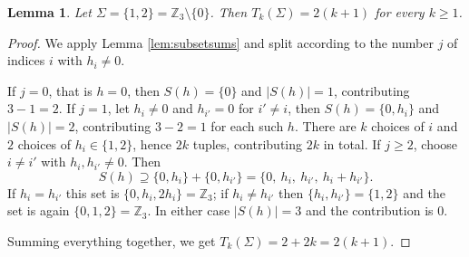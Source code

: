 \documentclass[10pt,a4paper]{amsart}
\newtheorem{lemma}{Lemma}
\newcommand{\Z}{\mathbb{Z}}
\begin{document}
\begin{lemma}\label{lem:Z3count}
Let $\Sigma=\{1,2\}=\Z_3\setminus\{0\}$. Then $T_k(\Sigma)=2(k+1)$ for every $k\ge1$.
\end{lemma}

\begin{proof}
We apply Lemma \ref{lem:subsetsums} and split according to the number $j$ of indices $i$ with $h_i\ne0$.

If $j=0$, that is $h=0$, then $S(h)=\{0\}$ and $|S(h)|=1$, contributing $3-1=2$.
If $j=1$, let $h_i\ne0$ and $h_{i'}=0$ for $i'\ne i$, then $S(h)=\{0,h_i\}$ and $|S(h)|=2$, contributing $3-2=1$ for each such $h$. There are $k$ choices of $i$ and $2$ choices of $h_i\in\{1,2\}$, hence $2k$ tuples, contributing $2k$ in total.
If $j\ge2$, choose $i\ne i'$ with $h_i,h_{i'}\ne0$. Then
\[
S(h)\supseteq\{0,h_i\}+\{0,h_{i'}\}=\{0,\ h_i,\ h_{i'},\ h_i+h_{i'}\}.
\]
If $h_i=h_{i'}$ this set is $\{0,h_i,2h_i\}=\Z_3$; if $h_i\ne h_{i'}$ then $\{h_i,h_{i'}\}=\{1,2\}$ and the set is again $\{0,1,2\}=\Z_3$. In either case $|S(h)|=3$ and the contribution is $0$.

Summing everything together, we get $T_k(\Sigma)=2+2k=2(k+1)$.
\end{proof}
\end{document}
